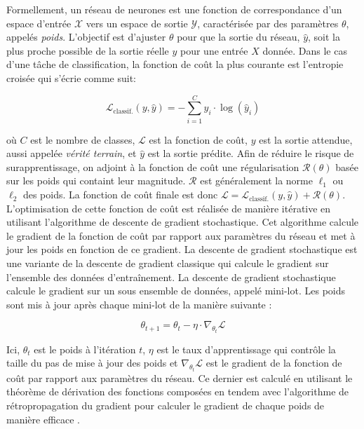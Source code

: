 Formellement, un réseau de neurones est une fonction de correspondance d'un
espace d'entrée $\mathcal{X}$ vers un espace de sortie $\mathcal{Y}$,
caractérisée par des paramètres $\theta$, appelés \emph{poids}. L'objectif est
d'ajuster $\theta$ pour que la sortie du réseau, $\hat{y}$, soit la plus proche
possible de la sortie réelle $y$ pour une entrée $X$ donnée. Dans le cas d'une
tâche de classification, la fonction de coût la plus courante est l'entropie
croisée qui s'écrie comme suit:

\begin{equation}
  \label{eqn:dlo:cross_entropy}
  \mathcal{L}_{\text{classif.}}(y, \hat{y}) = - \sum_{i=1}^{C} y_i \cdot \log(\hat{y}_i)
\end{equation}

\noindent où $C$ est le nombre de classes, $\mathcal{L}$ est la fonction de
coût, $y$ est la sortie attendue, aussi appelée \emph{vérité terrain}, et
$\hat{y}$ est la sortie prédite. Afin de réduire le risque de surapprentissage,
on adjoint à la fonction de coût une régularisation $\mathcal{R}(\theta)$ basée
sur les poids qui containt leur magnitude. $\mathcal{R}$ est généralement la
norme $\ell_1$ ou $\ell_2$ des poids. La fonction de coût finale est donc
$\mathcal{L} = \mathcal{L}_{\text{classif.}}(y,\hat{y}) +
  \mathcal{R}(\theta)$.\\


L'optimisation de cette fonction de coût est réalisée de manière itérative en
utilisant l'algorithme de descente de gradient stochastique. Cet algorithme
calcule le gradient de la fonction de coût par rapport aux paramètres du réseau
et met à jour les poids en fonction de ce gradient. La descente de gradient
stochastique est une variante de la descente de gradient classique qui calcule
le gradient sur l'ensemble des données d'entraînement. La descente de gradient
stochastique calcule le gradient sur un sous ensemble de données, appelé
mini-lot. Les poids sont mis à jour après chaque mini-lot de la manière
suivante :

\begin{equation}
  \label{eqn:dlo:sgd}
  \theta_{t+1} = \theta_t - \eta \cdot \nabla_{\theta_t} \mathcal{L}
\end{equation}

\noindent Ici, $\theta_t$ est le poids à l'itération $t$, $\eta$ est le taux
d'apprentissage qui contrôle la taille du pas de mise à jour des poids et
$\nabla_{\theta_t} \mathcal{L}$ est le gradient de la fonction de coût par
rapport aux paramètres du réseau. Ce dernier est calculé en utilisant le
théorème de dérivation des fonctions composées en tendem avec l'algorithme de
rétropropagation du gradient pour calculer le gradient de chaque poids de
manière efficace \cite{rumelhart1986learning}.\\

